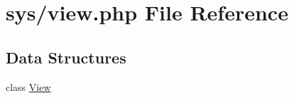 \hypertarget{view_8php}{}\section{sys/view.php File Reference}
\label{view_8php}
\subsection*{Data Structures}
\begin{DoxyCompactItemize}
\item 
class \hyperlink{classView}{View}
\end{DoxyCompactItemize}
